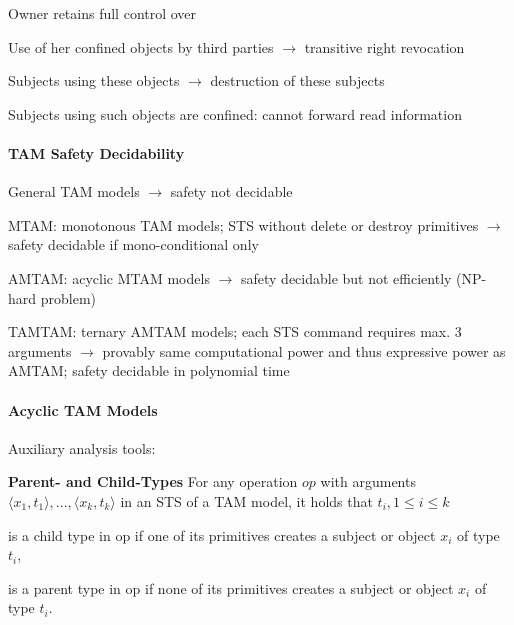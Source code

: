 \documentclass[a4paper]{article}
\renewcommand{\note}[2]{\begin{noteBox} \textbf{#1} #2 \end{noteBox}}
\begin{document}
\begin{multicols}{3}
    \begin{itemize*}
        \item Owner retains full control over
        \item Use of her confined objects by third parties $\rightarrow$ transitive right revocation
        \item Subjects using these objects $\rightarrow$ destruction of these subjects
        \item Subjects using such objects are confined: cannot forward read information
    \end{itemize*}

    \paragraph{TAM Safety Decidability}
    \begin{itemize*}
        \item General TAM models $\rightarrow$ safety not decidable
        \item MTAM: monotonous TAM models; STS without delete or destroy primitives $\rightarrow$ safety decidable if mono-conditional only
        \item AMTAM: acyclic MTAM models $\rightarrow$ safety decidable but not efficiently (NP-hard problem)
        \item TAMTAM: ternary AMTAM models; each STS command requires max. 3 arguments $\rightarrow$ provably same computational power and thus expressive power as AMTAM; safety decidable in polynomial time
    \end{itemize*}

    \paragraph{Acyclic TAM Models}
    Auxiliary analysis tools:

    \note{Parent- and Child-Types}{For any operation $op$ with arguments $\langle x_1,t_1\rangle ,...,\langle x_k,t_k\rangle$ in an STS of a TAM model, it holds that $t_i, 1\leq i\leq k$
        \begin{itemize*}
            \item is a child type in op if one of its primitives creates a subject or object $x_i$ of type $t_i$,
            \item is a parent type in op if none of its primitives creates a subject or object $x_i$ of type $t_i$.
        \end{itemize*}
    }


\end{multicols}
\end{document}
